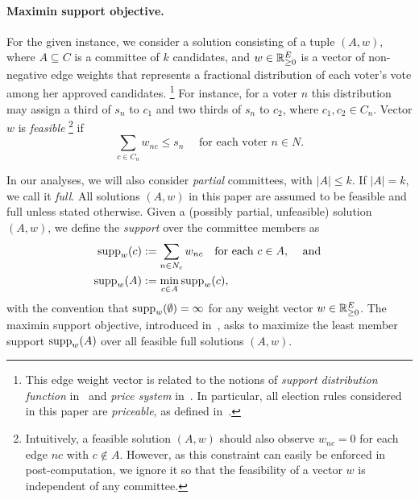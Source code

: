 \paragraph{Maximin support objective.} 
For the given instance, we consider a solution consisting of a tuple $(A,w)$, where $A\subseteq C$ is a committee of $k$ candidates, and $w\in\mathbb{R}_{\geq 0}^E$ is a vector of non-negative edge weights that represents a fractional distribution of each voter's vote among her approved candidates.%
\footnote{This edge weight vector is related to the notions of \emph{support distribution function} in~\cite{sanchez2016maximin} and \emph{price system} in~\cite{peters2019proportionality}. In particular, all election rules considered in this paper are \emph{priceable}, as defined in~\cite{peters2019proportionality}.} 
For instance, for a voter $n$ this distribution may assign a third of $s_n$ to $c_1$ and two thirds of $s_n$ to $c_2$, where $c_1, c_2\in C_n$.
Vector $w$ is \emph{feasible}%
\footnote{Intuitively, a feasible solution $(A,w)$ should also observe $w_{nc}=0$ for each edge $nc$ with $c\not\in A$. 
However, as this constraint can easily be enforced in post-computation, we ignore it so that the feasibility of a vector $w$ is independent of any committee.} 
if  %
%
\begin{equation}
    \sum_{c\in C_n} w_{nc}\leq s_n \quad \text{ for each voter } n\in N. \label{eq:feasible}
\end{equation}

In our analyses, we will also consider \emph{partial} committees, with $|A|\leq k$. If $|A|=k$, we call it \emph{full}. 
All solutions $(A,w)$ in this paper are assumed to be feasible and full unless stated otherwise. 
Given a (possibly partial, unfeasible) solution $(A,w)$, we define the \emph{support} over the committee members as 
\begin{align}
\operatorname{supp}_w(c) &:=\sum_{n\in N_c} w_{nc} \quad \text{for each $c\in A, \quad$ and } \nonumber \\
\operatorname{supp}_w(A)& :=\min_{c\in A} \operatorname{supp}_w(c), \label{eq:support}
\end{align}
with the convention that $\operatorname{supp}_w(\emptyset)=\infty$ for any weight vector $w\in\mathbb{R}_{\geq 0}^E$. 
The maximin support objective, introduced in~\cite{sanchez2016maximin}, asks to maximize the least member support $\operatorname{supp}_w(A)$ over all feasible full solutions $(A,w)$. 

